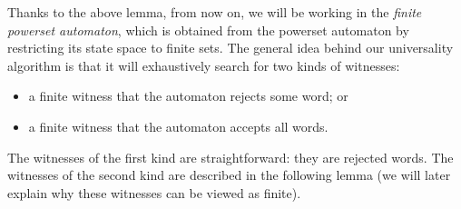 Thanks to the above lemma, from now on, we will be working in the \emph{finite powerset automaton}, which is obtained from the powerset automaton by restricting its state space to finite sets. The general idea behind our universality algorithm is that it will exhaustively search for two kinds of witnesses:
\begin{itemize}
    \item a finite witness that the automaton rejects some word; or 
    \item a finite witness that the automaton accepts all words.
\end{itemize}
The witnesses of the first kind are straightforward: they are rejected words. The witnesses of the second kind are described in the following lemma (we will later explain why these witnesses can be viewed as finite).



